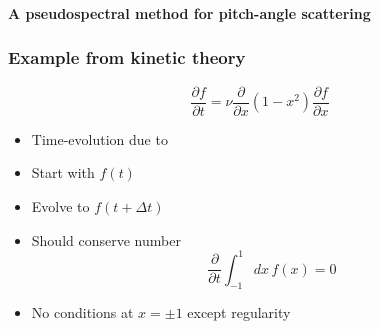 \begin{frame}
  \frametitle{}
  \begin{center}
    \textbf{\Large A pseudospectral method for pitch-angle scattering}
  \end{center}
\end{frame}

\begin{frame}
  \frametitle{Example from kinetic theory\\
    }
  \begin{tcolorbox}
    \begin{equation*}
      \frac{\partial f}{\partial t} = \nu \frac{\partial}{\partial x}
      (1-x^2) \frac{\partial f}{\partial x} 
    \end{equation*}
  \end{tcolorbox}
  \begin{itemize}
  \item<1-> Time-evolution due to 
  \item<2-> Start with $f(t)$
  \item<3-> Evolve to $f(t+\Delta t)$
  \item<4-> Should conserve number
    \begin{equation}
      \frac{\partial }{\partial t} \int_{-1}^{1} dx \, f(x) = 0
    \end{equation}
    \item<5-> No conditions at $x=\pm 1$ except regularity
  \end{itemize}
\end{frame}
